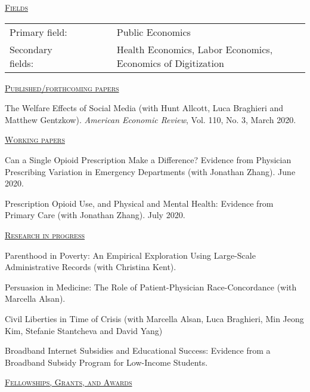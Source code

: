 \documentclass[letterpaper,11pt]{article}
\begin{document}
\underline {\textsc{Fields}}

\noindent\begin{tabular}{@{}l@{}lll@{}cl}
Primary field: &&&&& Public Economics \\
Secondary fields: &&&&& Health Economics, Labor Economics, Economics of Digitization
\end{tabular}


\bigskip
 
 
 \underline {\textsc{Published/forthcoming papers}}
 
The Welfare Effects of Social Media (with Hunt Allcott, Luca Braghieri and Matthew Gentzkow). \textit{American Economic Review}, Vol. 110, No. 3, March 2020.

\medskip

\underline {\textsc{Working papers}}

Can a Single Opioid Prescription Make a Difference? Evidence from Physician Prescribing Variation in Emergency Departments (with Jonathan Zhang). June 2020.

Prescription Opioid Use, and Physical and Mental Health: Evidence from Primary Care (with Jonathan Zhang). July 2020.


\medskip


\underline {\textsc{Research in progress}}

Parenthood in Poverty: An Empirical Exploration Using Large-Scale Administrative Records (with Christina Kent).

Persuasion in Medicine: The Role of Patient-Physician Race-Concordance (with Marcella Alsan).

Civil Liberties in Time of Crisis (with Marcella Alsan, Luca Braghieri, Min Jeong Kim, Stefanie Stantcheva and David Yang)

Broadband Internet Subsidies and Educational Success: Evidence from a Broadband Subsidy Program for Low-Income Students.

 
 \medskip


\underline {\textsc{Fellowships, Grants, and Awards}}
\end{document}
